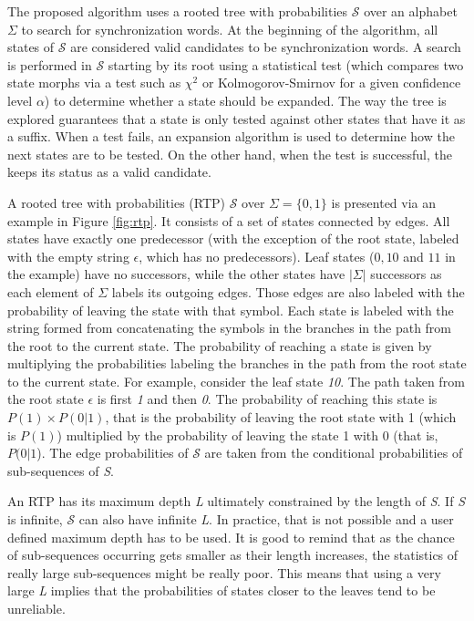 {The proposed algorithm uses a rooted tree with probabilities $\mathcal{S}$ over an alphabet $\Sigma$ to search for synchronization words. At the beginning of the algorithm, all states of $\mathcal{S}$ are considered valid candidates to be synchronization words. A search is performed in $\mathcal{S}$ starting by its root using a statistical test (which compares two state morphs via a test such as $\chi^2$ or Kolmogorov-Smirnov for a given confidence level $\alpha$) to determine whether a state should be expanded. The way the tree is explored guarantees that a state is only tested against other states that have it as a suffix. When a test fails, an expansion algorithm is used to determine how the next states are to be tested. On the other hand, when the test is successful, the keeps its status as a valid candidate.

A rooted tree with probabilities (RTP) $\mathcal{S}$ over $\Sigma = \{0, 1\}$ is presented via an example in Figure \ref{fig:rtp}. It consists of a set of states connected by edges. All states have exactly one predecessor (with the exception of the root state, labeled with the empty string $\epsilon$, which has no predecessors). Leaf states ($0, 10$ and $11$ in the example) have no successors, while the other states have $|\Sigma|$ successors as each element of $\Sigma$ labels its outgoing edges. Those edges are also labeled with the probability of leaving the state with that symbol. Each state is labeled with the string formed from concatenating the symbols in the branches in the path from the root to the current state. The probability of reaching a state is given by multiplying the probabilities labeling the branches in the path from the root state to the current state. For example, consider the leaf state \textit{10}. The path taken from the root state $\epsilon$ is first \textit{1} and then \textit{0}. The probability of reaching this state is $P(1)\times P(0|1)$, that is the probability of leaving the root state with 1 (which is $P(1)$) multiplied by the probability of leaving the state 1 with 0 (that is, $P(0|1$). The edge probabilities of $\mathcal{S}$ are taken from the conditional probabilities of sub-sequences of \textit{S}.

An RTP has its maximum depth \textit{L} ultimately constrained by the length of \textit{S}. If \textit{S} is infinite, $\mathcal{S}$ can also have infinite \textit{L}. In practice, that is not possible and a user defined maximum depth has to be used. It is good to remind that as the chance of sub-sequences occurring gets smaller as their length increases, the statistics of really large sub-sequences might be really poor. This means that using a very large \textit{L} implies that the probabilities of states closer to the leaves tend to be unreliable.

}

